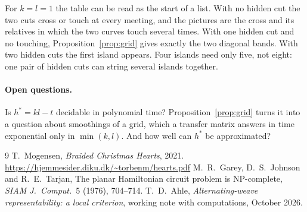 \documentclass[11pt,a4paper]{article}
\theoremstyle{definition}
\theoremstyle{remark}
\begin{document}
For $k=l=1$ the table can be read as the start of a list. With no hidden
cut the two cuts cross or touch at every meeting, and the pictures are the
cross and its relatives in which the two curves touch several times. With
one hidden cut and no touching, Proposition~\ref{prop:grid} gives exactly
the two diagonal bands. With two hidden cuts the first island appears. Four
islands need only five, not eight: one pair of hidden cuts can string
several islands together.

\paragraph{Open questions.}
Is $h^*=kl-t$ decidable in polynomial time? Proposition~\ref{prop:grid}
turns it into a question about smoothings of a grid, which a transfer
matrix answers in time exponential only in $\min(k,l)$. And how well can
$h^*$ be approximated?

\begin{thebibliography}{9}
T.~Mogensen, \emph{Braided Christmas Hearts}, 2021.
\url{https://hjemmesider.diku.dk/~torbenm/hearts.pdf}
M.~R.~Garey, D.~S.~Johnson and R.~E.~Tarjan, The planar Hamiltonian circuit
problem is NP-complete, \emph{SIAM J.\ Comput.}\ 5 (1976), 704--714.
T.~D.~Ahle, \emph{Alternating-weave representability: a local criterion},
working note with computations, October 2026.
\end{thebibliography}
\end{document}
